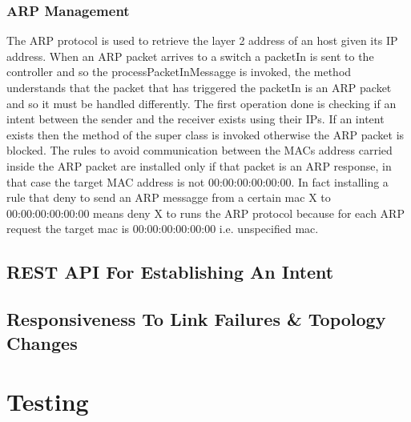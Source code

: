 \documentclass[a4paper]{report}
\begin{document}
	\subsection{ARP Management}
	\noindent The ARP protocol is used to retrieve the layer 2 address of an host given its IP address. When an ARP packet arrives to a switch a packetIn is sent to the controller and so the processPacketInMessagge is invoked, the method understands that the packet that has triggered the packetIn is an ARP packet and so it must be handled differently.
	\noindent The first operation done is checking if an intent between the sender and the receiver exists using their IPs. If an intent exists then the method of the super class is invoked otherwise the ARP packet is blocked. The rules to avoid communication between the MACs address carried inside the ARP packet are installed only if that packet is an ARP response, in that case the target MAC address is not 00:00:00:00:00:00. In fact installing a rule that deny to send an ARP messagge from a certain mac X to 00:00:00:00:00:00 means deny X to runs the ARP protocol because for each ARP request the target mac is 00:00:00:00:00:00 i.e. unspecified mac.
	
	
	\section{REST API For Establishing An Intent}
	\section{Responsiveness To Link Failures \& Topology Changes}
	\chapter{Testing}
	
\end{document}
